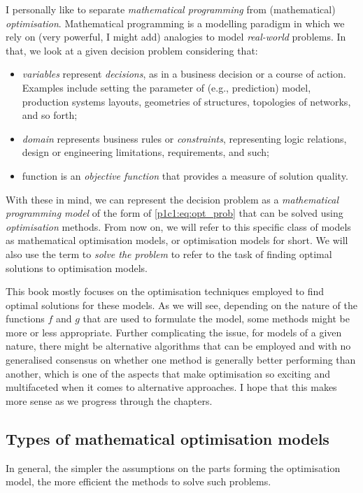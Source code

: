 I personally like to separate \emph{mathematical programming} from (mathematical) \emph{optimisation}. Mathematical programming is a modelling paradigm in which we rely on (very powerful, I might add) analogies to model \emph{real-world} problems. In that, we look at a given decision problem considering that:
%
\begin{itemize}
    \item \emph{variables} represent \emph{decisions}, as in a business decision or a course of action. Examples include setting the parameter of (e.g., prediction) model, production systems layouts, geometries of structures, topologies of networks, and so forth; 
    \item \emph{domain} represents business rules or \emph{constraints}, representing logic relations, design or engineering limitations, requirements, and such; 
    \item function is an \emph{objective function} that provides a measure of solution quality.  
\end{itemize}
%    
With these in mind, we can represent the decision problem as a \emph{mathematical programming model} of the form of \eqref{p1c1:eq:opt_prob} that can be solved using \emph{optimisation} methods. From now on, we will refer to this specific class of models as mathematical optimisation models, or optimisation models for short. We will also use the term to \emph{solve the problem} to refer to the task of finding optimal solutions to optimisation models.

This book mostly focuses on the optimisation techniques employed to find optimal solutions for these models. As we will see, depending on the nature of the functions $f$ and $g$ that are used to formulate the model, some methods might be more or less appropriate. Further complicating the issue, for models of a given nature, there might be alternative algorithms that can be employed and with no generalised consensus on whether one method is generally better performing than another, which is one of the aspects that make optimisation so exciting and multifaceted when it comes to alternative approaches. I hope that this makes more sense as we progress through the chapters. 


\subsection{Types of mathematical optimisation models}

In general, the simpler the assumptions on the parts forming the optimisation model, the more efficient the methods to solve such problems. 

